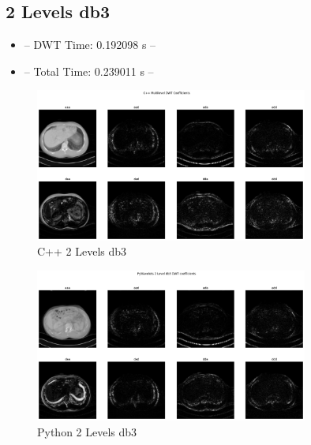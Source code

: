 \documentclass{article}
\begin{document}
\subsection{2 Levels db3}
\begin{itemize}
    \item -- DWT Time: 0.192098 s --
    \item -- Total Time: 0.239011 s --
\end{itemize}

\begin{figure}[H]
    \centering
    \includegraphics[width=0.8\textwidth]{assets/cpp-2-db3.png}
    \caption{C++ 2 Levels db3}
    \label{fig13}
\end{figure}

\begin{figure}[H]
    \centering
    \includegraphics[width=0.8\textwidth]{assets/py-2-db3.png}
    \caption{Python 2 Levels db3}
    \label{fig14}
\end{figure}
\end{document}
